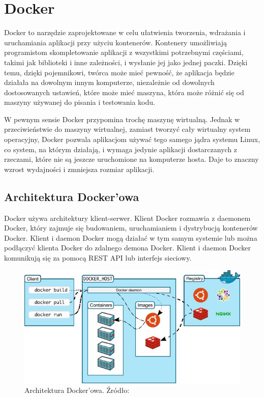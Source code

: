 \section{Docker}

Docker to narzędzie zaprojektowane w celu ułatwienia tworzenia, wdrażania i uruchamiania aplikacji przy użyciu kontenerów. Kontenery umożliwiają programistom skompletowanie aplikacji z wszystkimi potrzebnymi częściami, takimi jak biblioteki i inne zależności, i wysłanie jej jako jednej paczki. Dzięki temu, dzięki pojemnikowi, twórca może mieć pewność, że aplikacja będzie działała na dowolnym innym komputerze, niezależnie od dowolnych dostosowanych ustawień, które może mieć maszyna, która może różnić się od maszyny używanej do pisania i testowania kodu.

W pewnym sensie Docker przypomina trochę maszynę wirtualną. Jednak w przeciwieństwie do maszyny wirtualnej, zamiast tworzyć cały wirtualny system operacyjny, Docker pozwala aplikacjom używać tego samego jądra systemu Linux, co system, na którym działają, i wymaga jedynie aplikacji dostarczanych z rzeczami, które nie są jeszcze uruchomione na komputerze hosta. Daje to znaczny wzrost wydajności i zmniejsza rozmiar aplikacji. \cite{Docker}

\subsection{Architektura Docker'owa}
Docker używa architektury klient-serwer. Klient Docker rozmawia z daemonem Docker, który zajmuje się budowaniem, uruchamianiem i dystrybucją kontenerów Docker. Klient i daemon Docker mogą działać w tym samym systemie lub można podłączyć klienta Docker do zdalnego demona Docker. Klient i daemon Docker komunikują się za pomocą REST API lub interfejs sieciowy. \cite{Docker2}

\begin{figure}[h!]
  \centering
    \includegraphics[width=1.0\textwidth]{images/dockerarchitecture.jpg}
  \caption{Architektura Docker'owa. Źródło: \cite{Docker2}}
\end{figure}

